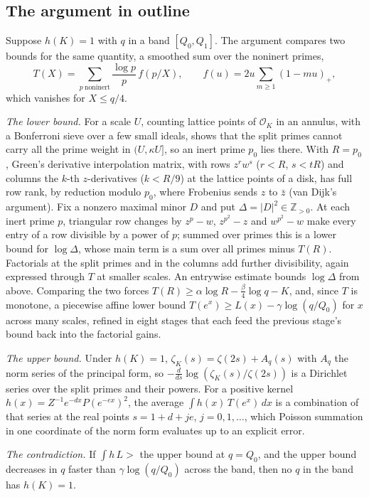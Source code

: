 \documentclass[11pt]{article}
\theoremstyle{definition}
\newcommand{\Z}{\mathbb{Z}}
\newcommand{\OK}{\mathcal{O}_K}
\begin{document}
\subsection{The argument in outline}
Suppose $h(K) = 1$ with $q$ in a band $[Q_0, Q_1]$. The argument compares two bounds for the same quantity, a smoothed sum over the noninert primes,
\[ T(X) = \sum_{p\ \text{noninert}} \frac{\log p}{p}\, f(p/X), \qquad f(u) = 2u\sum_{m\ge1}(1-mu)_+ , \]
which vanishes for $X \le q/4$.

\emph{The lower bound.} For a scale $U$, counting lattice points of $\OK$ in an annulus, with a Bonferroni sieve over a few small ideals, shows that the split primes cannot carry all the prime weight in $(U, \kappa U]$, so an inert prime $p_0$ lies there. With $R = p_0$, Green's derivative interpolation matrix, with rows $z^r w^s$ ($r < R$, $s < tR$) and columns the $k$-th $z$-derivatives ($k < R/9$) at the lattice points of a disk, has full row rank, by reduction modulo $p_0$, where Frobenius sends $z$ to $\bar z$ (van Dijk's argument). Fix a nonzero maximal minor $D$ and put $\Delta = |D|^2 \in \Z_{>0}$. At each inert prime $p$, triangular row changes by $z^p - w$, $z^{p^2} - z$ and $w^{p^2} - w$ make every entry of a row divisible by a power of $p$; summed over primes this is a lower bound for $\log\Delta$, whose main term is a sum over all primes minus $T(R)$. Factorials at the split primes and in the columns add further divisibility, again expressed through $T$ at smaller scales. An entrywise estimate bounds $\log\Delta$ from above. Comparing the two forces $T(R) \ge \alpha\log R - \frac\beta4\log q - K$, and, since $T$ is monotone, a piecewise affine lower bound $T(e^x) \ge L(x) - \gamma\log(q/Q_0)$ for $x$ across many scales, refined in eight stages that each feed the previous stage's bound back into the factorial gains.

\emph{The upper bound.} Under $h(K) = 1$, $\zeta_K(s) = \zeta(2s) + A_q(s)$ with $A_q$ the norm series of the principal form, so $-\frac{d}{ds}\log(\zeta_K(s)/\zeta(2s))$ is a Dirichlet series over the split primes and their powers. For a positive kernel $h(x) = Z^{-1}e^{-dx}P(e^{-ex})^2$, the average $\int h(x)\,T(e^x)\,dx$ is a combination of that series at the real points $s = 1 + d + je$, $j = 0, 1, \ldots$, which Poisson summation in one coordinate of the norm form evaluates up to an explicit error.

\emph{The contradiction.} If $\int h\,L > $ the upper bound at $q = Q_0$, and the upper bound decreases in $q$ faster than $\gamma\log(q/Q_0)$ across the band, then no $q$ in the band has $h(K) = 1$.
\end{document}
